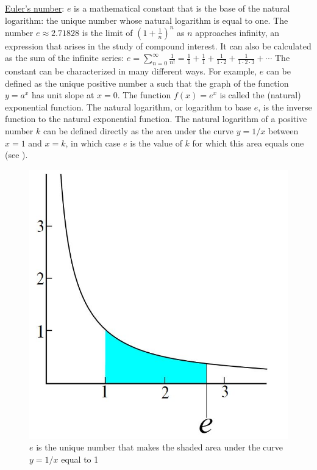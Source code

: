 \documentclass[12pt]{article}
\begin{document}
\begin{flushleft}
	\textbullet \quad \uline{Euler's number}: $e$ is a mathematical constant that is the base of the natural logarithm: the unique number whose natural logarithm is equal to one. The number $e\approx 2.71828$ is the limit of $\displaystyle \left( 1 + \frac{1}{n} \right)^n$ as $n$ approaches infinity, an expression that arises in the study of compound interest. It can also be calculated as the sum of the infinite series: \linebreak 
	$\displaystyle e= \sum \limits_{n=0}^{\infty} \frac{1}{n!} = \frac{1}{1} + \frac{1}{1} + \frac{1}{1\cdot 2} + \frac{1}{1\cdot 2 \cdot 3} + \cdots $ \linebreak 
	The constant can be characterized in many different ways. For example, $e$ can be defined as the unique positive number a such that the graph of the function $y = a^x$ has unit slope at $x = 0$. The function $f(x) = e^x$ is called the (natural) exponential function. The natural logarithm, or logarithm to base $e$, is the inverse function to the natural exponential function. The natural logarithm of a positive number $k$ can be defined directly as the area under the curve $y = 1/x$ between $x = 1$ and $x = k$, in which case $e$ is the value of $k$ for which this area equals one (see ). \linebreak 
	
	\pagebreak
	
	\begin{figure}[H]
	\centering
	\includegraphics[scale=0.4]{exponentialNumberAreaCurve}
	\caption{$e$ is the unique number that makes the shaded area under the curve $y = 1/x$ equal to 1}
	\label{fig:exponentialNumberAreaCurve}
	\end{figure} 
	

\end{flushleft}
\end{document}
